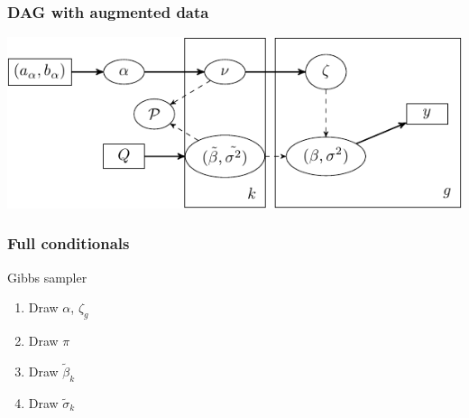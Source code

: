 \documentclass{beamer}
\begin{document}
\begin{frame}%
  \frametitle{DAG with augmented data}
  \includegraphics[width=\textwidth]{my_dag_small}
\end{frame}

\begin{frame}%
  \frametitle{Full conditionals}
  \begin{beamerboxesrounded}[upper=upcol,lower=lowcol,shadow=true]{Gibbs sampler}
    \begin{enumerate}
      \item Draw $\alpha$, $\zeta_g$
      \item Draw $\pi$
      \item Draw $\tilde{\beta}_k$
      \item Draw $\tilde{\sigma}_k$
    \end{enumerate}
  \end{beamerboxesrounded}
\end{frame}
\end{document}
